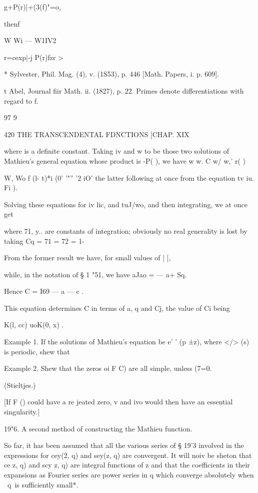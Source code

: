 g+P(r)|+(3(f)"=o, 



thenf 



W Wi — W1IV2 



r=cexp|-j P(r)fzr > 



* Sylvester, Phil. Mag. (4), v. (1S53), p. 446 [Math. Papers, i. p. 609]. 

t Abel, Journal fiir Math. ii. (1827), p. 22. Primes denote differentiations with regard to f. 

97 9 



420 THE TRANSCENDENTAL FDNCTIONS [CHAP. XIX 

where is a definite constant. Taking iv  and w  to be those two solutions of 
Mathieu's general equation whose product is -P( ), we have 
w  w.  C w/   w,'  r( ) 

W, Wo f (l- t)*i (0' '"''  '2  iO' 
the latter following at once from the equation tv iu. Fi ). 

Solving these equations for iv lic, and tuJ/wo, and then integrating, we at 
once get 

where 71, y.. are constants of integration; obviously no real generality is lost 
by taking Cq = 71 = 72 = 1- 

From the former result we have, for small values of |  |, 

while, in the notation of § 1 "51, we have aJao = —  a+ Sq. 

Hence C  = I69 — a — c . 

This equation determines C in terms of a, q and Cj, the value of Ci being 

K(l, cc)  uoK(0, x) . 

Example 1. If the solutions of Mathieu's equation be e' ' (p ±z), where </> (s) is 
periodic, shew that 

Example 2. Shew that the zeros oi F C) are all simple, unless (7=0. 

(Stieltjes.) 

[If F () could have a re jeated zero, v  and ivo would then have an essential singularity.] 

19"6. A second method of constructing the Mathieu function. 

So far, it has been assumed that all the various series of § 19'3 involved 
in the expressions for cey(2, q) and sey(z, q) are convergent. It will noiv be 
sheton that ce   z, q) and scy  z, q) are integral functions of z and that the 
coefficients in their expansions as Fourier series are power series in q which 
converge absolutely when \ q\ is sufficiently small*. 

